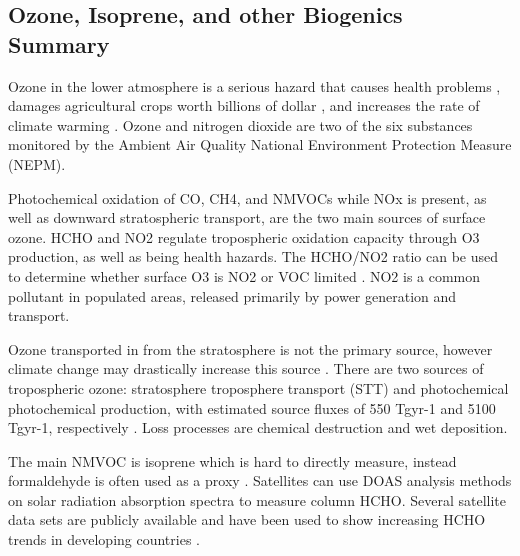 \subsection{Ozone, Isoprene, and other Biogenics Summary}
Ozone in the lower atmosphere is a serious hazard that causes health problems \cite{Hsieh_2013}, damages agricultural crops worth billions of dollar \cite{Avnery_2011}, and increases the rate of climate warming \cite{IPCC_2013_chap8}. 
Ozone and nitrogen dioxide are two of the six substances monitored by the Ambient Air Quality National Environment Protection Measure (NEPM). 
  
Photochemical oxidation of CO, CH4, and NMVOCs while NOx is present, as well as downward stratospheric transport, are the two main sources of surface ozone.
HCHO and NO2 regulate tropospheric oxidation capacity through O3 production, as well as being health hazards.
The HCHO/NO2 ratio can be used to determine whether surface O3 is NO2 or VOC limited \cite{Mahajan_2015}.
NO2 is a common pollutant in populated areas, released primarily by power generation and transport.

Ozone transported in from the stratosphere is not the primary source, however climate change may drastically increase this source \cite{Hegglin_2009}.
There are two sources of tropospheric ozone: stratosphere troposphere transport (STT) and photochemical photochemical production, with estimated source fluxes of 550 Tgyr-1 and 5100 Tgyr-1, respectively \cite{Stevenson_2006}. 
Loss processes are chemical destruction and wet deposition.

The main NMVOC is isoprene \cite{Guenther_2006} which is hard to directly measure, instead formaldehyde is often used as a proxy \cite{Marais_2012,bauwens2013satellite}. 
Satellites can use DOAS analysis methods on solar radiation absorption spectra to measure column HCHO.
Several satellite data sets are publicly available and have been used to show increasing HCHO trends in developing countries \cite{Mahajan_2015}.
  
  
  
  
  
  